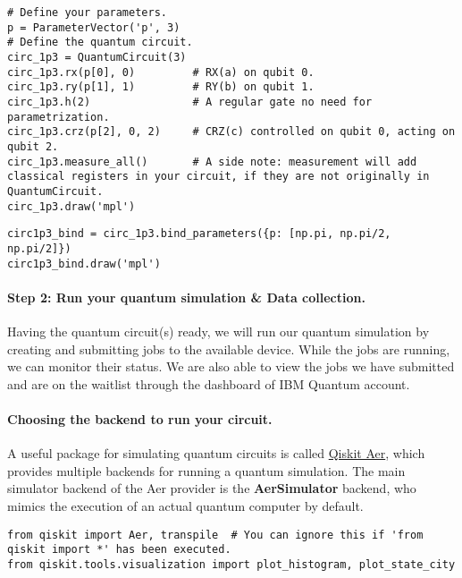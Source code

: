 \documentclass[%
oneside,                 %
final,                   %
10pt]{article}
\begin{document}
\begin{verbatim}
# Define your parameters.
p = ParameterVector('p', 3)  
# Define the quantum circuit.
circ_1p3 = QuantumCircuit(3)
circ_1p3.rx(p[0], 0)         # RX(a) on qubit 0.
circ_1p3.ry(p[1], 1)         # RY(b) on qubit 1.
circ_1p3.h(2)                # A regular gate no need for parametrization.
circ_1p3.crz(p[2], 0, 2)     # CRZ(c) controlled on qubit 0, acting on qubit 2.
circ_1p3.measure_all()       # A side note: measurement will add classical registers in your circuit, if they are not originally in QuantumCircuit. 
circ_1p3.draw('mpl')

\end{verbatim}





\begin{verbatim}
circ1p3_bind = circ_1p3.bind_parameters({p: [np.pi, np.pi/2, np.pi/2]})
circ1p3_bind.draw('mpl')

\end{verbatim}


\paragraph{Step 2: Run your quantum simulation {\&} Data collection.}
Having the quantum circuit(s) ready, we will run our quantum
simulation by creating and submitting jobs to the available
device. While the jobs are running, we can monitor their status. We
are also able to view the jobs we have submitted and are on the
waitlist through the dashboard of IBM Quantum account.

\paragraph{Choosing the backend to run your circuit.}
A useful package for simulating quantum circuits is called \href{{https://qiskit.org/documentation/tutorials/simulators/1_aer_provider.html}}{Qiskit Aer},
which provides multiple backends for running a quantum simulation. The main simulator backend of the Aer provider is the \textbf{AerSimulator} backend, who mimics the execution of an actual quantum computer by default.




\begin{verbatim}
from qiskit import Aer, transpile  # You can ignore this if 'from qiskit import *' has been executed.
from qiskit.tools.visualization import plot_histogram, plot_state_city

\end{verbatim}
\end{document}
